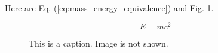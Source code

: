 \documentclass{article}
\begin{document}
Here are Eq. (\ref{eq:mass_energy_equivalence}) and Fig. \ref{fig:a}.

\begin{equation}
    E=mc^2 \label{eq:mass_energy_equivalence}
\end{equation}

\begin{figure}[htbp]
    \caption{This is a caption. Image is not shown.}
    \label{fig:a}
\end{figure}
\end{document}

